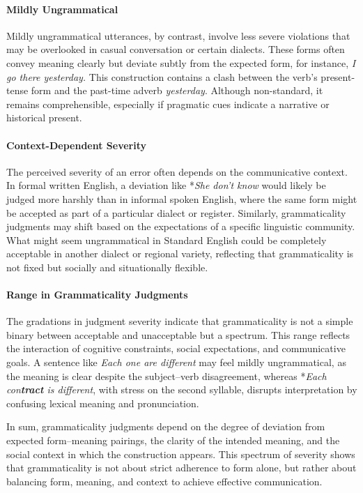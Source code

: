 \paragraph*{Mildly Ungrammatical}

Mildly ungrammatical utterances, by contrast, involve less severe violations that may be overlooked in casual conversation or certain dialects. These forms often convey meaning clearly but deviate subtly from the expected form, for instance, \textit{I go there yesterday.} This construction contains a clash between the verb's present-tense form and the past-time adverb \textit{yesterday}. Although non-standard, it remains comprehensible, especially if pragmatic cues indicate a narrative or historical present.

\paragraph*{Context-Dependent Severity}

The perceived severity of an error often depends on the communicative context. In formal written English, a deviation like *\textit{She don't know} would likely be judged more harshly than in informal spoken English, where the same form might be accepted as part of a particular dialect or register. Similarly, grammaticality judgments may shift based on the expectations of a specific linguistic community. What might seem ungrammatical in Standard English could be completely acceptable in another dialect or regional variety, reflecting that grammaticality is not fixed but socially and situationally flexible.

\paragraph*{Range in Grammaticality Judgments}

The gradations in judgment severity indicate that grammaticality is not a simple binary between acceptable and unacceptable but a spectrum. This range reflects the interaction of cognitive constraints, social expectations, and communicative goals. A sentence like \textit{Each one are different} may feel mildly ungrammatical, as the meaning is clear despite the subject–verb disagreement, whereas *\textit{Each con\textbf{tract} is different}, with stress on the second syllable, disrupts interpretation by confusing lexical meaning and pronunciation.

In sum, grammaticality judgments depend on the degree of deviation from expected form–meaning pairings, the clarity of the intended meaning, and the social context in which the construction appears. This spectrum of severity shows that grammaticality is not about strict adherence to form alone, but rather about balancing form, meaning, and context to achieve effective communication.

